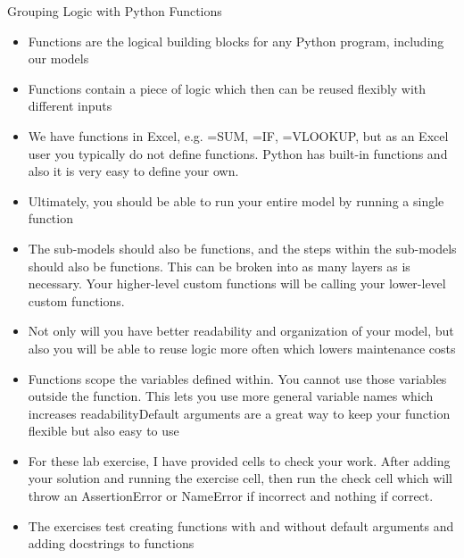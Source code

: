\documentclass[]{article}
\begin{document}
\begin{section}{Grouping Logic with Python Functions}
\begin{itemize}
\item Functions are the logical building blocks for any Python program, including our models
\item Functions contain a piece of logic which then can be reused flexibly with different inputs
\item We have functions in Excel, e.g. =SUM, =IF, =VLOOKUP, but as an Excel user you typically do not define functions. Python has built-in functions and also it is very easy to define your own.
\item Ultimately, you should be able to run your entire model by running a single function
\item The sub-models should also be functions, and the steps within the sub-models should also be functions. This can be broken into as many layers as is necessary. Your higher-level custom functions will be calling your lower-level custom functions.
\item Not only will you have better readability and organization of your model, but also you will be able to reuse logic more often which lowers maintenance costs
\item Functions scope the variables defined within. You cannot use those variables outside the function. This lets you use more general variable names which increases readabilityDefault arguments are a great way to keep your function flexible but also easy to use
\item For these lab exercise, I have provided cells to check your work. After adding your solution and running the exercise cell, then run the check cell which will throw an AssertionError or NameError if incorrect and nothing if correct.
\item The exercises test creating functions with and without default arguments and adding docstrings to functions
\end{itemize}
\end{section}
\end{document}
